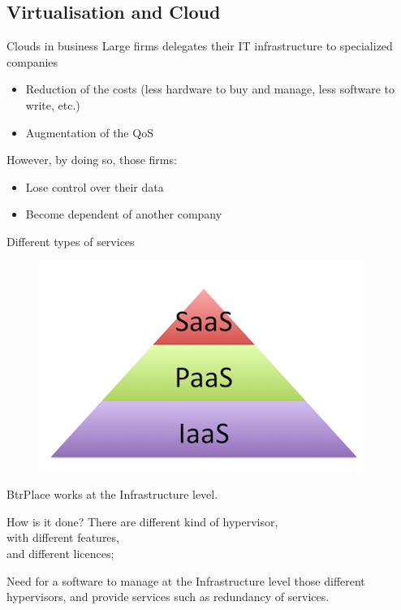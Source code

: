 \documentclass{beamer}
\begin{document}
\subsection{Virtualisation and Cloud}
\begin{frame}{Clouds in business}
Large firms delegates their IT infrastructure to specialized companies
\begin{itemize}
	\item Reduction of the costs (less hardware to buy and manage,
		less software to write, etc.)
	\item Augmentation of the QoS
\end{itemize}
However, by doing so, those firms:
\begin{itemize}
	\item Lose control over their data
	\item Become dependent of another company
\end{itemize}
\end{frame}

\begin{frame}{Different types of services}
\begin{figure}[!ht]
	\centering
	\includegraphics[scale=.45]{imgs/cloud-pyramid.png}
\end{figure}
BtrPlace works at the Infrastructure level.
\end{frame}

\begin{frame}{How is it done?}
There are different kind  of hypervisor,\\
\pause with different features,\\ %
\pause and different licences; %

Need for a software to manage at the Infrastructure level those
different hypervisors, and provide services such as redundancy of
services.
\end{frame}
\end{document}
